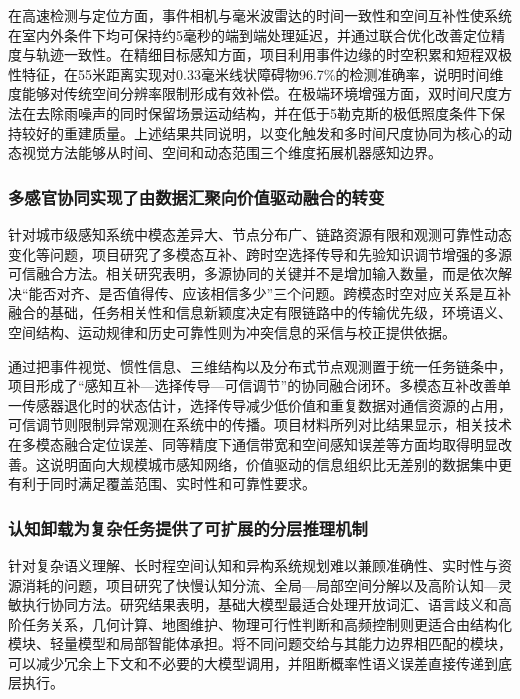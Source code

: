 在高速检测与定位方面，事件相机与毫米波雷达的时间一致性和空间互补性使系统在室内外条件下均可保持约5毫秒的端到端处理延迟，并通过联合优化改善定位精度与轨迹一致性。在精细目标感知方面，项目利用事件边缘的时空积累和短程双极性特征，在55米距离实现对0.33毫米线状障碍物96.7\%的检测准确率，说明时间维度能够对传统空间分辨率限制形成有效补偿。在极端环境增强方面，双时间尺度方法在去除雨噪声的同时保留场景运动结构，并在低于5勒克斯的极低照度条件下保持较好的重建质量。上述结果共同说明，以变化触发和多时间尺度协同为核心的动态视觉方法能够从时间、空间和动态范围三个维度拓展机器感知边界。

\subsubsection{多感官协同实现了由数据汇聚向价值驱动融合的转变}

针对城市级感知系统中模态差异大、节点分布广、链路资源有限和观测可靠性动态变化等问题，项目研究了多模态互补、跨时空选择传导和先验知识调节增强的多源可信融合方法。相关研究表明，多源协同的关键并不是增加输入数量，而是依次解决“能否对齐、是否值得传、应该相信多少”三个问题。跨模态时空对应关系是互补融合的基础，任务相关性和信息新颖度决定有限链路中的传输优先级，环境语义、空间结构、运动规律和历史可靠性则为冲突信息的采信与校正提供依据。

通过把事件视觉、惯性信息、三维结构以及分布式节点观测置于统一任务链条中，项目形成了“感知互补---选择传导---可信调节”的协同融合闭环。多模态互补改善单一传感器退化时的状态估计，选择传导减少低价值和重复数据对通信资源的占用，可信调节则限制异常观测在系统中的传播。项目材料所列对比结果显示，相关技术在多模态融合定位误差、同等精度下通信带宽和空间感知误差等方面均取得明显改善。这说明面向大规模城市感知网络，价值驱动的信息组织比无差别的数据集中更有利于同时满足覆盖范围、实时性和可靠性要求。

\subsubsection{认知卸载为复杂任务提供了可扩展的分层推理机制}

针对复杂语义理解、长时程空间认知和异构系统规划难以兼顾准确性、实时性与资源消耗的问题，项目研究了快慢认知分流、全局---局部空间分解以及高阶认知---灵敏执行协同方法。研究结果表明，基础大模型最适合处理开放词汇、语言歧义和高阶任务关系，几何计算、地图维护、物理可行性判断和高频控制则更适合由结构化模块、轻量模型和局部智能体承担。将不同问题交给与其能力边界相匹配的模块，可以减少冗余上下文和不必要的大模型调用，并阻断概率性语义误差直接传递到底层执行。

